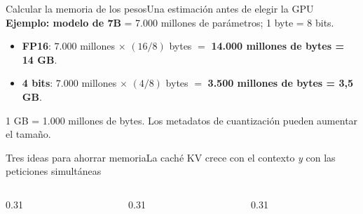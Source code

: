 \begin{frame}{Calcular la memoria de los pesos}{Una estimación antes de elegir la GPU}
	\vspace{2pt}
	\footnotesize
	\textbf{Ejemplo: modelo de 7B} = 7.000 millones de parámetros; 1 byte = 8 bits.
	\begin{itemize}
		\setlength{\itemsep}{0pt}
		\item \textbf{FP16}: $7.000$ millones $\times$ $(16 / 8)$ bytes
		      $=$ \textbf{14.000 millones de bytes = 14 GB}.
		\item \textbf{4 bits}: $7.000$ millones $\times$ $(4 / 8)$ bytes
		      $=$ \textbf{3.500 millones de bytes = 3,5 GB}.
	\end{itemize}
	1 GB = 1.000 millones de bytes. Los metadatos de cuantización pueden aumentar el tamaño.
\end{frame}

\begin{frame}{Tres ideas para ahorrar memoria}{La caché KV crece con el contexto \emph{y} con las peticiones simultáneas}
	\begin{columns}[T]
		\begin{column}{0.31\textwidth}
		\end{column}
		\begin{column}{0.31\textwidth}
		\end{column}
		\begin{column}{0.31\textwidth}
		\end{column}
	\end{columns}
\end{frame}

